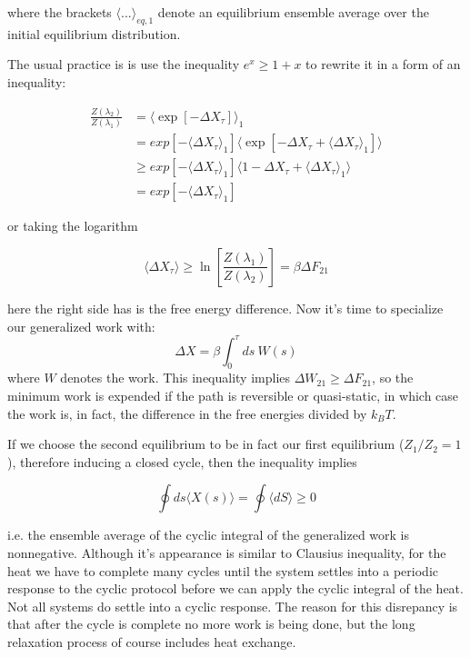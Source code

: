 \documentclass[a4paper,12pt,nofootinbib]{article}
\begin{document}
where the brackets $\langle ... \rangle_{eq,1}$ denote an equilibrium ensemble average over the initial equilibrium distribution.

The usual practice is is use the inequality $e^x \geq 1+x $ to rewrite it in a form of an inequality:

\begin{equation}
\begin{aligned}
  \frac{Z(\lambda_2)}{Z(\lambda_1)} &=\langle \exp[-\Delta X_\tau ]\rangle_1 \\
  &=exp[-\langle\Delta X_\tau \rangle_1]\langle \exp[-\Delta X_\tau + \langle \Delta X_\tau \rangle_1]\rangle \\
  &\geq exp[-\langle\Delta X_\tau \rangle_1]\langle 1- \Delta X_\tau + \langle \Delta X_\tau \rangle_1 \rangle \\
  &=exp[-\langle\Delta X_\tau \rangle_1]
\end{aligned}
\end{equation}

or taking the logarithm

\begin{equation}
  \langle \Delta X_\tau \rangle \geq \ln[\frac{Z(\lambda_1)}{Z(\lambda_2)}]=\beta \Delta F_{21}
\end{equation}

here the right side has is the free energy difference. Now it's time to specialize our generalized work with:
\begin{equation}
  \Delta X = \beta \int_0^\tau ds\ W(s)
\end{equation}
where $W$ denotes the work. This inequality implies $\Delta W_{21} \geq \Delta F_{21} $, so the minimum work is expended if the path is reversible or quasi-static, in which case the work is, in fact, the difference in the free energies divided by $k_B T$.

If we choose the second equilibrium to be in fact our first equilibrium ($Z_1/Z_2=1$), therefore inducing a closed cycle, then the inequality implies

\begin{equation}
\label{CyclicInequalityForGeneralizedWork}
  \oint ds \langle X(s) \rangle = \oint \langle dS \rangle \geq 0
\end{equation}

i.e. the ensemble average of the cyclic integral of the generalized work is nonnegative.
Although it's appearance is similar to Clausius inequality, for the heat we have to complete many cycles until the system settles into a periodic response to the cyclic protocol before we can apply the cyclic integral of the heat. Not all systems do settle into a cyclic response. The reason for this disrepancy is that after the cycle is complete no more work is being done, but the long relaxation process of course includes heat exchange. 
\end{document}
